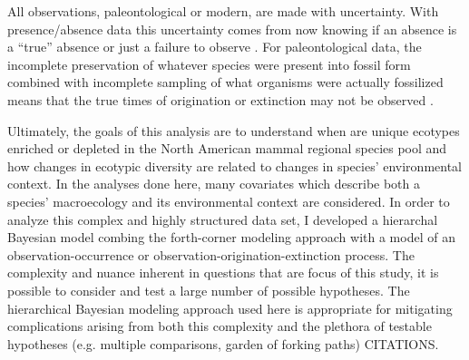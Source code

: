 \documentclass[12pt,letterpaper]{article}
\begin{document}
All observations, paleontological or modern, are made with uncertainty. With presence/absence data this uncertainty comes from now knowing if an absence is a ``true'' absence or just a failure to observe \citep{Royle2008,Royle2014,Foote1999a,Foote2001,Lloyd2011,Wang2016b}. For paleontological data, the incomplete preservation of whatever species were present into fossil form combined with incomplete sampling of what organisms were actually fossilized means that the true times of origination or extinction may not be observed \citep{Foote1999a,Foote2001,Wang2015,Wang2016b}.

Ultimately, the goals of this analysis are to understand when are unique ecotypes enriched or depleted in the North American mammal regional species pool and how changes in ecotypic diversity are related to changes in species' environmental context. In the analyses done here, many covariates which describe both a species' macroecology and its environmental context are considered. In order to analyze this complex and highly structured data set, I developed a hierarchal Bayesian model combing the forth-corner modeling approach with a model of an observation-occurrence or observation-origination-extinction process. The complexity and nuance inherent in questions that are focus of this study, it is possible to consider and test a large number of possible hypotheses. The hierarchical Bayesian modeling approach used here is appropriate for mitigating complications arising from both this complexity and the plethora of testable hypotheses (e.g. multiple comparisons, garden of forking paths) CITATIONS. 
\end{document}

